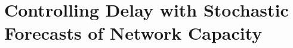 \chapter{Controlling Delay with Stochastic Forecasts of Network Capacity}
\label{chap:sprout}

%




%





%
%
